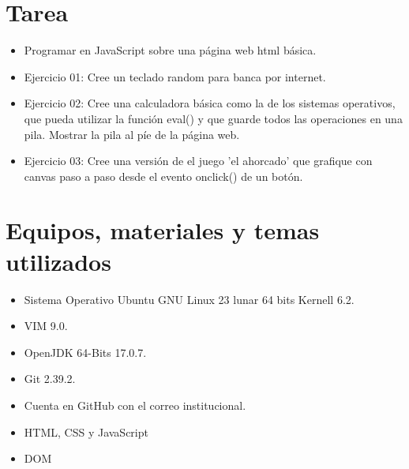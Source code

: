 \documentclass{article}
\begin{document}
	\section{Tarea}
	\begin{itemize}		
		\item Programar en JavaScript sobre una página web html básica.
		\item Ejercicio 01: Cree un teclado random para banca por internet.
		\item Ejercicio 02: Cree una calculadora básica como la de los sistemas operativos, que pueda utilizar
la función eval() y que guarde todos las operaciones en una pila. Mostrar la pila al píe de la página
web.
		\item Ejercicio 03: Cree una versión de el juego ’el ahorcado’ que grafique con canvas paso a paso
desde el evento onclick() de un botón.

	\end{itemize}
		
	\section{Equipos, materiales y temas utilizados}
	\begin{itemize}
		\item Sistema Operativo Ubuntu GNU Linux 23 lunar 64 bits Kernell 6.2.
		\item VIM 9.0.
		\item OpenJDK 64-Bits 17.0.7.
		\item Git 2.39.2.
		\item Cuenta en GitHub con el correo institucional.
		\item HTML, CSS y JavaScript
		\item DOM
	\end{itemize}
	
\end{document}
